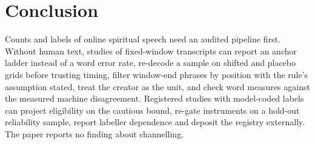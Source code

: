 
\section{Conclusion}
\label{sec:conclusion}

Counts and labels of online spiritual speech need an audited pipeline first. Without human text, studies of fixed-window transcripts can report an anchor ladder instead of a word error rate, re-decode a sample on shifted and placebo grids before trusting timing, filter window-end phrases by position with the rule's assumption stated, treat the creator as the unit, and check word measures against the measured machine disagreement. Registered studies with model-coded labels can project eligibility on the cautious bound, re-gate instruments on a hold-out reliability sample, report labeller dependence and deposit the registry externally. \ResConclusion{} The paper reports no finding about channelling.

